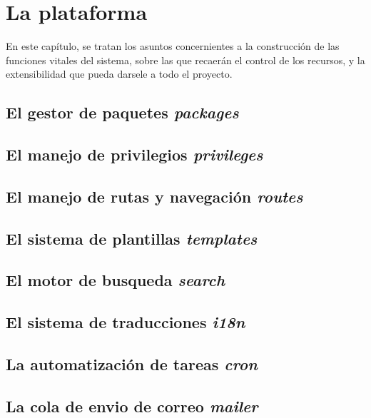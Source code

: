 \chapter{La plataforma}

En este capítulo, se tratan los asuntos concernientes a la construcción de las funciones vitales del sistema, sobre las que
recaerán el control de los recursos, y la extensibilidad que pueda darsele a todo el proyecto.

\section{El gestor de paquetes \emph{packages}}


\section{El manejo de privilegios \emph{privileges}}
\section{El manejo de rutas y navegación \emph{routes}}

\section{El sistema de plantillas \emph{templates}}

\section{El motor de busqueda \emph{search}}
\section{El sistema de traducciones \emph{i18n}}
\section{La automatización de tareas \emph{cron}}
\section{La cola de envio de correo \emph{mailer}}
